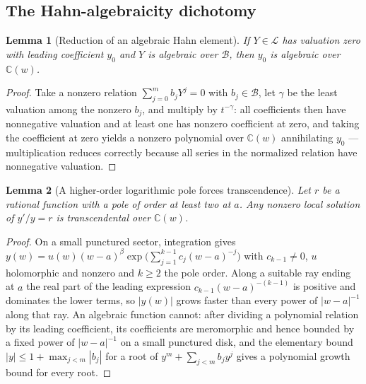 \documentclass[11pt,letterpaper]{article}
\newtheorem{lemma}[lemma]{Lemma}
\theoremstyle{definition}
\theoremstyle{remark}
\newcommand{\C}{\mathbb C}
\newcommand{\BB}{\mathscr B}
\newcommand{\LL}{\mathscr L}
\numberwithin{equation}{section}
\begin{document}
\subsection{The Hahn-algebraicity dichotomy}

\begin{lemma}[Reduction of an algebraic Hahn element]\label{dyn:lem:reduction}
If $Y\in\LL$ has valuation zero with leading coefficient $y_0$ and $Y$ is
algebraic over $\BB$, then $y_0$ is algebraic over $\C(w)$.
\end{lemma}
\begin{proof}
Take a nonzero relation $\sum_{j=0}^{m}b_jY^{j}=0$ with $b_j\in\BB$, let
$\gamma$ be the least valuation among the nonzero $b_j$, and multiply by
$t^{-\gamma}$: all coefficients then have nonnegative valuation and at
least one has nonzero coefficient at zero, and taking the coefficient at
zero yields a nonzero polynomial over $\C(w)$ annihilating $y_0$ ---
multiplication reduces correctly because all series in the normalized
relation have nonnegative valuation.
\end{proof}

\begin{lemma}[A higher-order logarithmic pole forces transcendence]
\label{dyn:lem:essential}
Let $r$ be a rational function with a pole of order at least two at $a$.
Any nonzero local solution of $y'/y=r$ is transcendental over $\C(w)$.
\end{lemma}
\begin{proof}
On a small punctured sector, integration gives
$y(w)=u(w)(w-a)^{\beta}\exp\bigl(\sum_{j=1}^{k-1}c_j(w-a)^{-j}\bigr)$ with
$c_{k-1}\ne0$, $u$ holomorphic and nonzero and $k\ge2$ the pole order.
Along a suitable ray ending at $a$ the real part of the leading expression
$c_{k-1}(w-a)^{-(k-1)}$ is positive and dominates the lower terms, so
$|y(w)|$ grows faster than every power of $|w-a|^{-1}$ along that ray. An
algebraic function cannot: after dividing a polynomial relation by its
leading coefficient, its coefficients are meromorphic and hence bounded by
a fixed power of $|w-a|^{-1}$ on a small punctured disk, and the elementary
bound $|y|\le1+\max_{j<m}|b_j|$ for a root of $y^{m}+\sum_{j<m}b_jy^{j}$
gives a polynomial growth bound for every root.
\end{proof}
\end{document}
